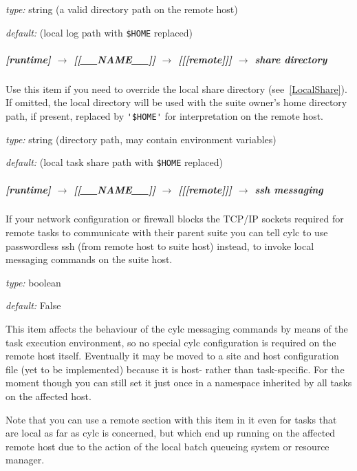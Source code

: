 \begin{myitemize}
\item {\em type:} string (a valid directory path on the remote host)
\item {\em default:} (local log path with \lstinline=$HOME= replaced)
\end{myitemize}

\subparagraph[share directory]{[runtime] $\rightarrow$ [[\_\_NAME\_\_]] $\rightarrow$ [[[remote]]] $\rightarrow$ share directory}

Use this item if you need to override the local share directory 
(see~\ref{LocalShare}). If omitted, the local directory will be used
with the suite owner's home directory path, if present, replaced by
\lstinline='$HOME'= for interpretation on the remote host.

\begin{myitemize}
\item {\em type:} string (directory path, may contain environment variables)
\item {\em default:} (local task share path with \lstinline=$HOME= replaced)
\end{myitemize}

\subparagraph[ssh messaging]{[runtime] $\rightarrow$ [[\_\_NAME\_\_]] $\rightarrow$ [[[remote]]] $\rightarrow$ ssh messaging}

If your network configuration or firewall blocks the TCP/IP sockets
required for remote tasks to communicate with their parent suite
you can tell cylc to use passwordless ssh (from remote host to suite
host) instead, to invoke local messaging commands on the suite host.

\begin{myitemize}
\item {\em type:} boolean
\item {\em default:} False
\end{myitemize}

This item affects the behaviour of the cylc messaging commands by means
of the task execution environment, so no special cylc configuration is
required on the remote host itself. Eventually it may be moved to a site
and host configuration file (yet to be implemented) because it is host-
rather than task-specific. For the moment though you can still set it
just once in a namespace inherited by all tasks on the affected host.

Note that you can use a remote section with this item in it even for
tasks that are local as far as cylc is concerned, but which end up
running on the affected remote host due to the action of the local batch
queueing system or resource manager.


